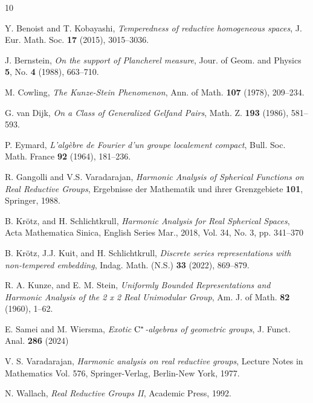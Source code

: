 \documentclass[12pt,letterpaper,titlepage,reqno]{amsart}
\theoremstyle{plain}
\theoremstyle{definition}
\numberwithin{equation}{section}
\begin{document}
\begin{thebibliography} {10}
	
 Y. Benoist and T. Kobayashi, {\it Temperedness of reductive homogeneous spaces}, J. Eur. Math. Soc. {\bf 17} (2015), 3015--3036.

 J. Bernstein, {\it On the support of Plancherel measure}, Jour. of Geom. and Physics {\bf 5}, No. {\bf 4} (1988), 663--710.
	
 M. Cowling, {\it The Kunze-Stein Phenomenon}, Ann. of Math. {\bf 107} (1978), 209--234.

 G. van Dijk, {\it On a Class of Generalized Gelfand Pairs}, Math. Z. {\bf 193} (1986), 581--593.

 P. Eymard, {\it L'alg\`ebre de {F}ourier d'un groupe localement compact}, Bull. Soc. Math. France {\bf 92} (1964), 181--236.

 R. Gangolli and V.S. Varadarajan, {\it Harmonic Analysis of Spherical Functions on Real Reductive Groups}, Ergebnisse der Mathematik und ihrer Grenzgebiete {\bf 101}, Springer, 1988.

 B. Kr\"otz, and H. Schlichtkrull, {\it Harmonic Analysis for Real Spherical Spaces}, Acta Mathematica Sinica, English Series   Mar., 2018, Vol. 34, No. 3, pp. 341--370

 B. Kr{\"o}tz, J.J. Kuit, and H. Schlichtkrull, {\it Discrete series representations with non-tempered embedding}, Indag. Math. (N.S.) {\bf 33} (2022), 869--879.

 R. A. Kunze, and E. M. Stein, {\it Uniformly Bounded Representations and Harmonic Analysis of the 2 x 2 Real Unimodular Group}, Am. J. of Math. {\bf 82} (1960), 1--62.

 E. Samei and M. Wiersma, {\it Exotic {$\rm C^*$}-algebras of geometric groups}, J. Funct. Anal. {\bf 286} (2024)

V. S. Varadarajan, {\it Harmonic analysis on real reductive groups}, Lecture Notes in Mathematics Vol. 576, Springer-Verlag, Berlin-New York, 1977.

 N. Wallach, {\it Real Reductive Groups II}, Academic Press, 1992.
\end{thebibliography}
	
\end{document}
